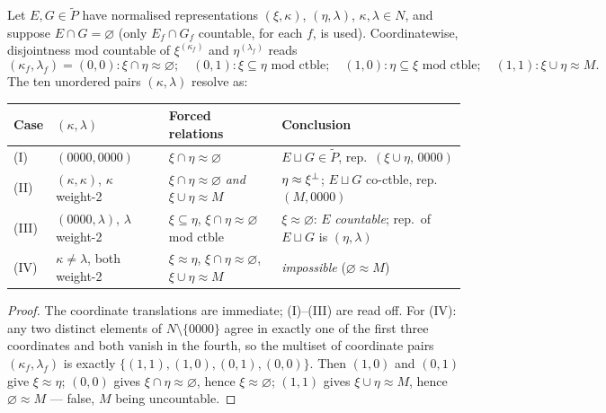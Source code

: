 \begin{lemma}\label{lem:table}
Let $E,G\in\widetilde P$ have normalised representations $(\xi,\kappa)$,
$(\eta,\lambda)$, $\kappa,\lambda\in N$, and suppose $E\cap G=\varnothing$
(only $E_f\cap G_f$ countable, for each $f$, is used). Coordinatewise,
disjointness mod countable of $\xi^{(\kappa_f)}$ and $\eta^{(\lambda_f)}$ reads
\[
  (\kappa_f,\lambda_f)=(0,0)\!: \xi\cap\eta\approx\varnothing;\quad
  (0,1)\!: \xi\subseteq\eta \text{ mod ctble};\quad
  (1,0)\!: \eta\subseteq\xi \text{ mod ctble};\quad
  (1,1)\!: \xi\cup\eta\approx M.
\]
The ten unordered pairs $(\kappa,\lambda)$ resolve as:
\begin{center}
\begin{tabular}{@{}llll@{}}
\toprule
Case & $(\kappa,\lambda)$ & Forced relations & Conclusion \\
\midrule
(I) & $(0000,0000)$ & $\xi\cap\eta\approx\varnothing$ &
  $E\sqcup G\in\widetilde P$, rep.\ $(\xi\cup\eta,\,0000)$ \\
(II) & $(\kappa,\kappa)$, $\kappa$ weight-2 &
  $\xi\cap\eta\approx\varnothing$ \emph{and} $\xi\cup\eta\approx M$ &
  $\eta\approx\xi{}^{\perp}$; $E\sqcup G$ co-ctble, rep.\ $(M,0000)$ \\
(III) & $(0000,\lambda)$, $\lambda$ weight-2 &
  $\xi\subseteq\eta$, $\xi\cap\eta\approx\varnothing$ mod ctble &
  $\xi\approx\varnothing$: $E$ \emph{countable}; rep.\ of $E\sqcup G$ is $(\eta,\lambda)$ \\
(IV) & $\kappa\neq\lambda$, both weight-2 &
  $\xi\approx\eta$, $\xi\cap\eta\approx\varnothing$, $\xi\cup\eta\approx M$ &
  \emph{impossible} ($\varnothing\approx M$) \\
\bottomrule
\end{tabular}
\end{center}
\end{lemma}

\begin{proof}
The coordinate translations are immediate; (I)--(III) are read off. For (IV):
any two distinct elements of $N\setminus\{0000\}$ agree in exactly one of the
first three coordinates and both vanish in the fourth, so the multiset of
coordinate pairs $(\kappa_f,\lambda_f)$ is exactly
$\{(1,1),(1,0),(0,1),(0,0)\}$. Then $(1,0)$ and $(0,1)$ give $\xi\approx\eta$;
$(0,0)$ gives $\xi\cap\eta\approx\varnothing$, hence $\xi\approx\varnothing$;
$(1,1)$ gives $\xi\cup\eta\approx M$, hence $\varnothing\approx M$ --- false,
$M$ being uncountable.
\end{proof}

